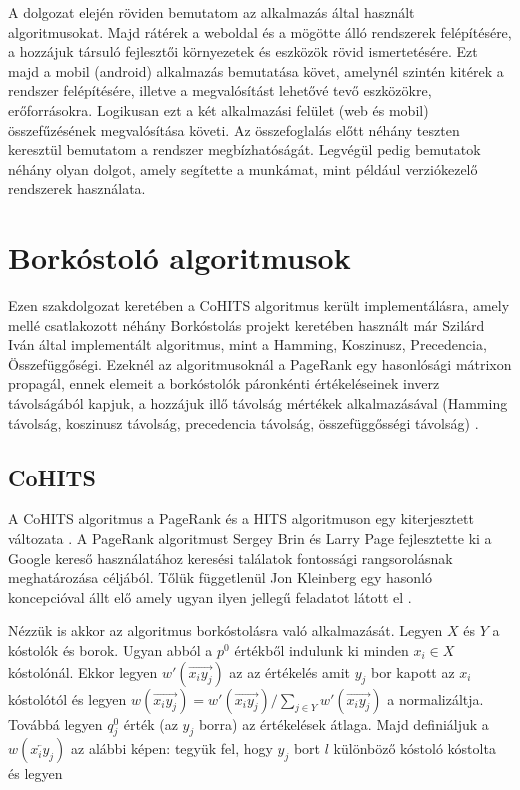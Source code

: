 \documentclass[12pt]{report}
\theoremstyle{definition}
\begin{document}
	A dolgozat elején röviden bemutatom az alkalmazás által használt algoritmusokat. Majd rátérek a weboldal és a mögötte álló rendszerek felépítésére, a hozzájuk társuló fejlesztői környezetek és eszközök rövid ismertetésére. Ezt majd a mobil (android) alkalmazás bemutatása követ, amelynél szintén kitérek a rendszer felépítésére, illetve a megvalósítást lehetővé tevő eszközökre,  erőforrásokra. Logikusan ezt a két alkalmazási felület (web és mobil) összefűzésének megvalósítása követi. Az összefoglalás előtt néhány teszten keresztül bemutatom a rendszer megbízhatóságát. Legvégül pedig bemutatok néhány olyan dolgot, amely segítette a munkámat, mint például verziókezelő rendszerek használata.
	
	\chapter{Borkóstoló algoritmusok}
	
	Ezen szakdolgozat keretében a CoHITS algoritmus került implementálásra, amely mellé csatlakozott néhány Borkóstolás projekt \cite{Borkostolas projekt} keretében használt már Szilárd Iván által implementált algoritmus, mint a Hamming, Koszinusz, Precedencia, Összefüggőségi. Ezeknél az algoritmusoknál a PageRank egy hasonlósági mátrixon propagál, ennek elemeit a borkóstolók páronkénti értékeléseinek inverz távolságából kapjuk, a hozzájuk illő távolság mértékek alkalmazásával (Hamming távolság, koszinusz távolság, precedencia távolság, összefüggősségi távolság) \cite{Borkostolas projekt}.
	
	\section{CoHITS}
	A CoHITS algoritmus a PageRank és a HITS algoritmuson egy kiterjesztett változata \cite{CoHITS}. A PageRank algoritmust Sergey Brin és Larry Page fejlesztette ki a Google kereső használatához \cite{PageRank} keresési találatok fontossági rangsorolásnak meghatározása céljából. Tőlük függetlenül Jon Kleinberg egy hasonló koncepcióval állt elő amely ugyan ilyen jellegű feladatot látott el \cite{HITS}.
	
	Nézzük is akkor az algoritmus borkóstolásra való alkalmazását. Legyen $ X $ és $ Y $ a kóstolók és borok. Ugyan abból a $p^0$ értékből indulunk ki minden $x_{i} \in X $ kóstolónál. Ekkor legyen $w'\left(\overrightarrow{x_{i}y_{j}}\right)$ az az értékelés amit $y_j$ bor kapott az $x_i$ kóstolótól és legyen $w\left(\overrightarrow{x_{i}y_{j}}\right)=w'\left(\overrightarrow{x_{i}y_{j}}\right)/\sum_{j \in Y}w'\left(\overrightarrow{x_{i}y_{j}}\right)$ a normalizáltja. Továbbá legyen $q_j^0$ érték (az $y_j$ borra) az értékelések átlaga. Majd definiáljuk a $w\left(\overleftarrow{x_iy_j}\right)$ az alábbi képen: tegyük fel, hogy $y_j$ bort $l$ különböző kóstoló kóstolta és legyen
	
\end{document}

